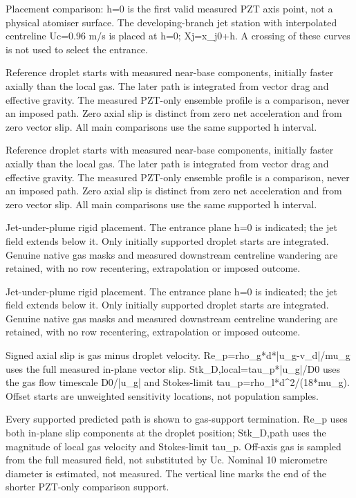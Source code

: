 \caption{Placement comparison: h=0 is the first valid measured PZT axis point, not a physical atomiser surface. The developing-branch jet station with interpolated centreline Uc=0.96 m/s is placed at h=0; Xj=x\_j0+h. A crossing of these curves is not used to select the entrance.}

\caption{Reference droplet starts with measured near-base components, initially faster axially than the local gas. The later path is integrated from vector drag and effective gravity. The measured PZT-only ensemble profile is a comparison, never an imposed path. Zero axial slip is distinct from zero net acceleration and from zero vector slip. All main comparisons use the same supported h interval.}

\caption{Reference droplet starts with measured near-base components, initially faster axially than the local gas. The later path is integrated from vector drag and effective gravity. The measured PZT-only ensemble profile is a comparison, never an imposed path. Zero axial slip is distinct from zero net acceleration and from zero vector slip. All main comparisons use the same supported h interval.}

\caption{Jet-under-plume rigid placement. The entrance plane h=0 is indicated; the jet field extends below it. Only initially supported droplet starts are integrated. Genuine native gas masks and measured downstream centreline wandering are retained, with no row recentering, extrapolation or imposed outcome.}

\caption{Jet-under-plume rigid placement. The entrance plane h=0 is indicated; the jet field extends below it. Only initially supported droplet starts are integrated. Genuine native gas masks and measured downstream centreline wandering are retained, with no row recentering, extrapolation or imposed outcome.}

\caption{Signed axial slip is gas minus droplet velocity. Re\_p=rho\_g*d*|u\_g-v\_d|/mu\_g uses the full measured in-plane vector slip. Stk\_D,local=tau\_p*|u\_g|/D0 uses the gas flow timescale D0/|u\_g| and Stokes-limit tau\_p=rho\_l*d^2/(18*mu\_g). Offset starts are unweighted sensitivity locations, not population samples.}

\caption{Every supported predicted path is shown to gas-support termination. Re\_p uses both in-plane slip components at the droplet position; Stk\_D,path uses the magnitude of local gas velocity and Stokes-limit tau\_p. Off-axis gas is sampled from the full measured field, not substituted by Uc. Nominal 10 micrometre diameter is estimated, not measured. The vertical line marks the end of the shorter PZT-only comparison support.}

